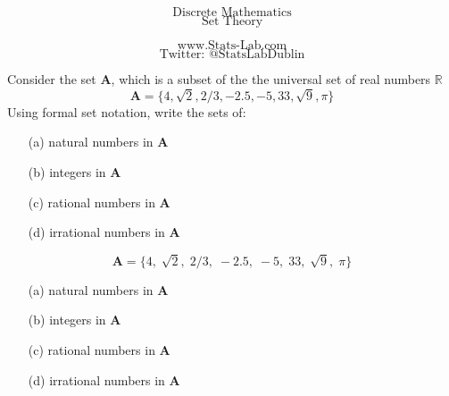 \documentclass{beamer}
\begin{document}
\begin{frame}
\Huge
\[\mbox{Discrete Mathematics}\]
\Huge
\[\mbox{Set Theory}\]

\Large
\[\mbox{www.Stats-Lab.com}\]
\Large
\[\mbox{Twitter: @StatsLabDublin}\]

\end{frame}
\begin{frame}
\Large
Consider the set \textbf{A}, which is a subset of the the universal set of real numbers $\mathbb{R}$
 \[\boldsymbol{A} = \{4, \sqrt{2}, 2/3, -2.5, -5, 33, \sqrt{9}, \pi \}\]
Using formal set notation, write the sets of:
\begin{itemize}
\item[(a)] natural numbers in \textbf{A}
\item[(b)] integers in \textbf{A}
\item[(c)] rational numbers in \textbf{A}
\item[(d)] irrational numbers in \textbf{A}
\end{itemize}
\end{frame}
\begin{frame}
\Large
\vspace{-0.5cm}
\[\boldsymbol{A} = \{4,\; \sqrt{2},\; 2/3,\; -2.5,\; -5,\; 33,\; \sqrt{9},\; \pi \}\]
\vspace{-0.5cm}
\begin{itemize}
\item[(a)] natural numbers in \textbf{A}\\
\item[(b)] integers in \textbf{A}\\
\item[(c)] rational numbers in \textbf{A}\\
\item[(d)] irrational numbers in \textbf{A}\\
\end{itemize}
\end{frame}
\end{document}
